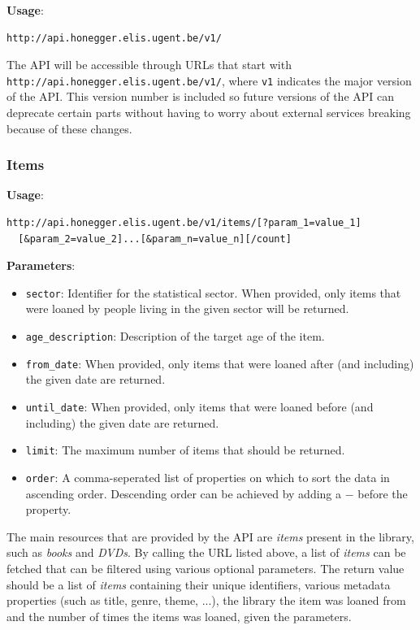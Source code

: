 {\bf Usage}:
\begin{verbatim}
http://api.honegger.elis.ugent.be/v1/
\end{verbatim}

The API will be accessible through URLs that start with \texttt{http://api.honegger.elis.ugent.be/v1/}, where \texttt{v1} indicates the major version of the API. This version number is included so future versions of the API can deprecate certain parts without having to worry about external services breaking because of these changes.

\subsubsection{Items}

{\bf Usage}:
\begin{verbatim}
http://api.honegger.elis.ugent.be/v1/items/[?param_1=value_1]
  [&param_2=value_2]...[&param_n=value_n][/count]
\end{verbatim}

{\bf Parameters}:
\begin{itemize}
  \item \texttt{sector}: Identifier for the statistical sector. When provided, only items that were loaned by people living in the given sector will be returned.
  \item \texttt{age\_description}: Description of the target age of the item.
  \item \texttt{from\_date}: When provided, only items that were loaned after (and including) the given date are returned.
  \item \texttt{until\_date}: When provided, only items that were loaned before (and including) the given date are returned.
  \item \texttt{limit}: The maximum number of items that should be returned.
  \item \texttt{order}: A comma-seperated list of properties on which to sort the data in ascending order. Descending order can be achieved by adding a $-$ before the property.
\end{itemize}

The main resources that are provided by the API are \emph{items} present in the library, such as \emph{books} and \emph{DVDs}.
By calling the URL listed above, a list of \emph{items} can be fetched that can be filtered using various optional parameters.
The return value should be a list of \emph{items} containing their unique identifiers, various metadata properties (such as title, genre, theme, ...), the library the item was loaned from and the number of times the items was loaned, given the parameters.\\

